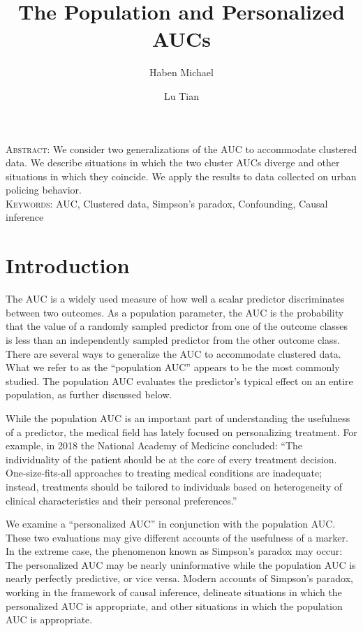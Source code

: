 \documentclass[12pt]{article}
\title{The Population and Personalized AUCs}
\author[1]{Haben Michael}
\author[2]{Lu Tian}
\affil[1]{University of Massachusetts}
\affil[2]{Stanford University}
\date{}
\begin{document}
\maketitle
\noindent\textsc{Abstract:} We consider two generalizations of the AUC to accommodate
clustered data. We describe situations in which the two cluster AUCs
diverge and other situations in which they coincide. We apply the
results to data collected on urban policing behavior.\\
\textsc{Keywords:} AUC, Clustered data, Simpson's paradox,  Confounding, Causal inference

\section{Introduction}
The AUC is a widely used measure of how well a scalar predictor
discriminates between two outcomes. As a population parameter, the AUC
is the probability that the value of a randomly sampled predictor from
one of the outcome classes is less than an independently sampled
predictor from the other outcome class. There are several ways to
generalize the AUC to accommodate clustered data. What we refer to as
the ``population AUC'' appears to be the most commonly studied. The
population AUC evaluates the predictor's typical effect on an entire
population, as further discussed below.

While the population AUC is an important part of understanding the
usefulness of a predictor, the medical field has lately focused on
personalizing treatment. %
For example, in 2018 the National Academy of Medicine concluded: ``The
individuality of the patient should be at the core of every treatment
decision. One-size-fits-all approaches to treating medical conditions
are inadequate; instead, treatments should be tailored to individuals
based on heterogeneity of clinical characteristics and their personal
preferences.''

We examine a ``personalized AUC'' in conjunction with the population
AUC.  These two evaluations may give different accounts of the
usefulness of a marker. In the extreme case, the phenomenon known as
Simpson's paradox may occur: The personalized AUC may be nearly
uninformative while the population AUC is nearly perfectly
predictive, or vice versa. Modern accounts of Simpson's paradox,
working in the framework of causal inference, delineate situations in
which the personalized AUC is appropriate, and other situations in which
the population AUC is appropriate. 
  
\end{document}
